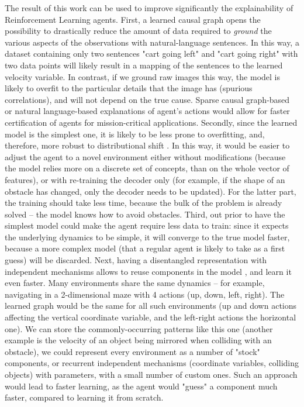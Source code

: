 \documentclass[a4paper,11pt,oneside]{report}
\begin{document}
The result of this work can be used to improve significantly the explainability of Reinforcement Learning agents. First, a learned causal graph opens the possibility to drastically reduce the amount of data required to {\em ground} \cite{Lahlou2019,Hui2020} the various aspects of the observations with natural-language sentences.
In this way, a dataset containing only two sentences "cart going left" and "cart going right" with two data points will likely result in a mapping of the sentences to the learned velocity variable. In contrast, if we ground raw images this way, the model is likely to overfit to the particular details that the image has (spurious correlations), and will not depend on the true cause.
Sparse causal graph-based or natural language-based explanations \cite{Madumal2019,Ehsan2018,Abramson2020} of agent's actions would allow for faster certification of agents for mission-critical applications.
Secondly, since the learned model is the simplest one, it is likely to be less prone to overfitting, and, therefore, more robust to distributional shift \cite{VanSteenkiste2020,Gomez2006,Priol2021}. In this way, it would be easier to adjust the agent to a novel environment either without modifications (because the model relies more on a discrete set of concepts, than on the whole vector of features), or with re-training the decoder only (for example, if the shape of an obstacle has changed, only the decoder needs to be updated). For the latter part, the training should take less time, because the bulk of the problem is already solved -- the model knows how to avoid obstacles.
Third, out prior to have the simplest model could make the agent require less data to train: since it expects the underlying dynamics to be simple, it will converge to the true model faster, because a more complex model (that a regular agent is likely to take as a first guess) will be discarded.
Next, having a disentangled representation with independent mechanisms allows to reuse components in the model \cite{Bengio2012,Veerapaneni2019,Didolkar2021,Gomez2006}, and learn it even faster. Many environments share the same dynamics -- for example, navigating in a 2-dimensional maze with 4 actions (up, down, left, right). The learned graph would be the same for all such environments (up and down actions affecting the vertical coordinate variable, and the left-right actions the horizontal one). We can store the commonly-occurring patterns like this one (another example is the velocity of an object being mirrored when colliding with an obstacle), we could represent every environment as a number of "stock" components, or recurrent independent mechanisms (coordinate variables, colliding objects) with parameters, with a small number of custom ones. Such an approach would lead to faster learning, as the agent would "guess" a component much faster, compared to learning it from scratch.
\end{document}
